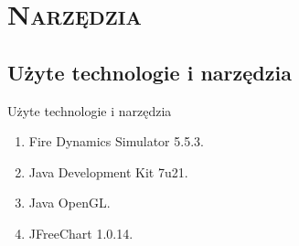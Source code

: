\section{\scshape Narzędzia}

\subsection{Użyte technologie i narzędzia}
\begin{frame}{Użyte technologie i narzędzia}

\begin{enumerate}
  \item Fire Dynamics Simulator 5.5.3.
  \item Java Development Kit 7u21.
  \item Java OpenGL.
  \item JFreeChart 1.0.14.
\end{enumerate}

\end{frame}